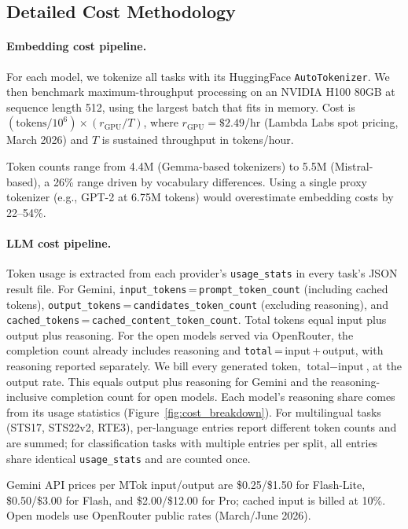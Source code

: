 \subsection{Detailed Cost Methodology}
\label{app:cost_detail}

\paragraph{Embedding cost pipeline.}
For each model, we tokenize all \mteblm{} tasks with its HuggingFace \texttt{AutoTokenizer}. We then benchmark maximum-throughput processing on an NVIDIA H100 80GB at sequence length 512, using the largest batch that fits in memory. Cost is $(\text{tokens} / 10^6) \times (r_{\text{GPU}} / T)$, where $r_{\text{GPU}} = \$2.49$/hr (Lambda Labs spot pricing, March 2026) and $T$ is sustained throughput in tokens/hour.

Token counts range from 4.4M (Gemma-based tokenizers) to 5.5M (Mistral-based), a 26\% range driven by vocabulary differences.
Using a single proxy tokenizer (e.g., GPT-2 at 6.75M tokens) would overestimate embedding costs by 22--54\%.

\paragraph{LLM cost pipeline.}
Token usage is extracted from each provider's \texttt{usage\_stats} in every task's JSON result file.
For Gemini, \texttt{input\_tokens}\,=\,\texttt{prompt\_token\_count} (including cached tokens), \texttt{output\_tokens}\,=\,\texttt{candidates\_token\_count} (excluding reasoning), and \texttt{cached\_tokens}\,=\,\texttt{cached\_content\_token\_count}. Total tokens equal input plus output plus reasoning.
For the open models served via OpenRouter, the completion count already includes reasoning and \texttt{total}\,=\,input\,+\,output, with reasoning reported separately.
We bill every generated token, $\text{total}-\text{input}$, at the output rate. This equals output plus reasoning for Gemini and the reasoning-inclusive completion count for open models. Each model's reasoning share comes from its usage statistics (Figure~\ref{fig:cost_breakdown}).
For multilingual tasks (STS17, STS22v2, RTE3), per-language entries report different token counts and are summed; for classification tasks with multiple entries per split, all entries share identical \texttt{usage\_stats} and are counted once.

Gemini API prices per MTok input/output are \$0.25/\$1.50 for Flash-Lite, \$0.50/\$3.00 for Flash, and \$2.00/\$12.00 for Pro; cached input is billed at 10\%. Open models use OpenRouter public rates (March/June 2026).

